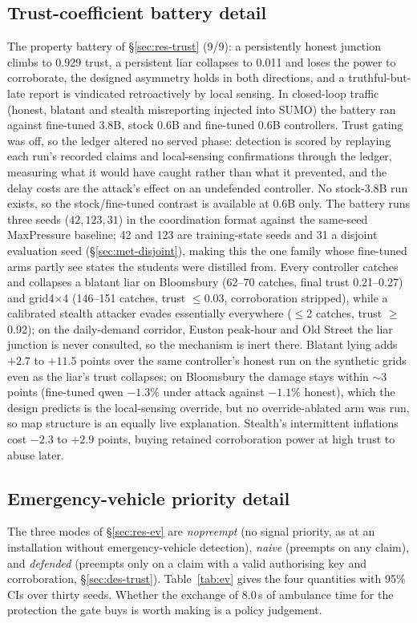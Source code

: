 \subsection{Trust-coefficient battery detail}\label{app:trust}
The property battery of \S\ref{sec:res-trust} (9/9): a persistently honest
junction climbs to 0.929 trust, a persistent liar collapses to 0.011 and
loses the power to corroborate, the designed asymmetry holds in both
directions, and a truthful-but-late report is vindicated retroactively by
local sensing. In closed-loop traffic (honest, blatant and stealth
misreporting injected into SUMO) the battery ran against fine-tuned 3.8B,
stock 0.6B and fine-tuned 0.6B controllers. Trust gating was off, so the
ledger altered no served phase: detection is scored by replaying each
run's recorded claims and local-sensing confirmations through the ledger,
measuring what it would have caught rather than what it prevented, and the
delay costs are the attack's effect on an undefended controller. No
stock-3.8B run exists, so the stock/fine-tuned contrast is available at
0.6B only. The battery runs three seeds ($42, 123, 31$) in the
coordination format against the same-seed MaxPressure baseline; 42 and 123
are training-state seeds and 31 a disjoint evaluation seed
(\S\ref{sec:met-disjoint}), making this the one family whose fine-tuned
arms partly see states the students were distilled from. Every controller
catches and collapses a blatant liar on Bloomsbury (62--70 catches, final
trust 0.21--0.27) and grid4$\times$4 (146--151 catches, trust $\le$0.03,
corroboration stripped), while a calibrated stealth attacker evades
essentially everywhere ($\le$2 catches, trust $\ge$0.92); on the
daily-demand corridor, Euston peak-hour and Old Street the liar junction is
never consulted, so the mechanism is inert there. Blatant lying adds $+2.7$ to $+11.5$ points
over the same controller's honest run on the synthetic grids even as the
liar's trust collapses; on Bloomsbury the damage stays within $\sim$3
points (fine-tuned qwen $-1.3\%$ under attack against $-1.1\%$ honest),
which the design predicts is the local-sensing override, but no
override-ablated arm was run, so map structure is an equally live
explanation. Stealth's intermittent inflations cost $-2.3$ to $+2.9$
points, buying retained corroboration power at high trust to abuse later.

\subsection{Emergency-vehicle priority detail}\label{app:ev-detail}
The three modes of \S\ref{sec:res-ev} are \emph{nopreempt} (no signal
priority, as at an installation without emergency-vehicle detection),
\emph{naive} (preempts on any claim), and \emph{defended} (preempts only on
a claim with a valid authorising key and corroboration,
\S\ref{sec:des-trust}). Table~\ref{tab:ev} gives the four quantities with
95\% CIs over thirty seeds. Whether the exchange of 8.0\,s of ambulance
time for the protection the gate buys is worth making is a policy
judgement.

